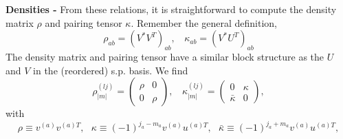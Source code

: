 {\bf Densities - } From these relations, it is straightforward to compute the 
density matrix $\rho$ and pairing tensor $\kappa$. Remember the general 
definition,
\begin{equation}
\rho_{ab} = (V^{*}V^{T})_{ab}, \ \ \ \ \kappa_{ab} = (V^{*}U^{T})_{ab}
\end{equation}
The density matrix and pairing tensor have a similar block structure as the 
$U$ and $V$ in the (reordered) s.p. basis. We find
\begin{equation}
\rho^{(lj)}_{|m|} = 
\left(
\begin{array}{cc}
\rho & 0 \\
0 & \rho
\end{array}
\right),\ \ \ \ 
\kappa^{(lj)}_{|m|} = 
\left(
\begin{array}{cc}
0 & \kappa \\
\bar{\kappa} & 0
\end{array}
\right),
\end{equation}
with 
\begin{equation}
\rho \equiv v^{(a)}v^{(a)T}, 
\ \ \ 
\kappa \equiv (-1)^{j_{a}-m_{a}} v^{(a)}u^{(a)T},
\ \ \ 
\bar{\kappa} \equiv (-1)^{j_{a}+m_{a}} v^{(a)}u^{(a)T},
\end{equation}


